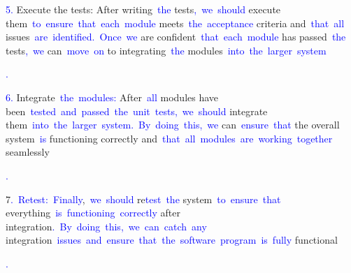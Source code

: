 \documentclass{article}
\begin{document}
\begin{tcolorbox}[colframe=black,colback=white]
{}\textcolor{blue}{5}\textcolor{blue}{.} Execute the tests: After writing\textcolor{blue}{~the} tests\textcolor{blue}{,}\textcolor{blue}{~we}\textcolor{blue}{~should} execute them\textcolor{blue}{~to}\textcolor{blue}{~ensure}\textcolor{blue}{~that}\textcolor{blue}{~each}\textcolor{blue}{~module} meets\textcolor{blue}{~the}\textcolor{blue}{~acceptance} criteria and\textcolor{blue}{~that}\textcolor{blue}{~all} issues\textcolor{blue}{~are}\textcolor{blue}{~identified}\textcolor{blue}{.}\textcolor{blue}{~Once}\textcolor{blue}{~we} are confident\textcolor{blue}{~that}\textcolor{blue}{~each}\textcolor{blue}{~module} has passed\textcolor{blue}{~the} tests\textcolor{blue}{,}\textcolor{blue}{~we} can\textcolor{blue}{~move}\textcolor{blue}{~on} to integrating\textcolor{blue}{~the} modules\textcolor{blue}{~into}\textcolor{blue}{~the}\textcolor{blue}{~larger}\textcolor{blue}{~system}\textcolor{blue}{.

}\textcolor{blue}{6}\textcolor{blue}{.} Integrate\textcolor{blue}{~the}\textcolor{blue}{~modules}\textcolor{blue}{:} After\textcolor{blue}{~all} modules have been\textcolor{blue}{~tested}\textcolor{blue}{~and}\textcolor{blue}{~passed}\textcolor{blue}{~the}\textcolor{blue}{~unit}\textcolor{blue}{~tests}\textcolor{blue}{,}\textcolor{blue}{~we}\textcolor{blue}{~should} integrate them\textcolor{blue}{~into}\textcolor{blue}{~the}\textcolor{blue}{~larger}\textcolor{blue}{~system}\textcolor{blue}{.}\textcolor{blue}{~By}\textcolor{blue}{~doing}\textcolor{blue}{~this}\textcolor{blue}{,}\textcolor{blue}{~we} can\textcolor{blue}{~ensure}\textcolor{blue}{~that} the overall system\textcolor{blue}{~is} functioning correctly and\textcolor{blue}{~that}\textcolor{blue}{~all}\textcolor{blue}{~modules}\textcolor{blue}{~are}\textcolor{blue}{~working}\textcolor{blue}{~together} seamlessly\textcolor{blue}{.

}7\textcolor{blue}{.}\textcolor{blue}{~Ret}\textcolor{blue}{est}\textcolor{blue}{:}\textcolor{blue}{~Finally},\textcolor{blue}{~we}\textcolor{blue}{~should} re\textcolor{blue}{test}\textcolor{blue}{~the} system\textcolor{blue}{~to}\textcolor{blue}{~ensure}\textcolor{blue}{~that} everything\textcolor{blue}{~is}\textcolor{blue}{~functioning}\textcolor{blue}{~correctly} after integration\textcolor{blue}{.}\textcolor{blue}{~By}\textcolor{blue}{~doing}\textcolor{blue}{~this}\textcolor{blue}{,}\textcolor{blue}{~we}\textcolor{blue}{~can}\textcolor{blue}{~catch}\textcolor{blue}{~any} integration\textcolor{blue}{~issues}\textcolor{blue}{~and}\textcolor{blue}{~ensure}\textcolor{blue}{~that}\textcolor{blue}{~the}\textcolor{blue}{~software}\textcolor{blue}{~program}\textcolor{blue}{~is}\textcolor{blue}{~fully} functional\textcolor{blue}{.

}
\end{tcolorbox}
\end{document}
